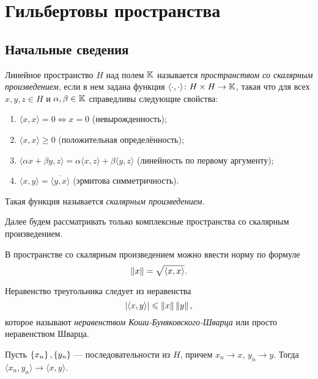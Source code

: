 \section{Гильбертовы пространства}
\subsection{Начальные сведения}
\begin{definition}
    Линейное пространство $H$ над полем $\mathbb{K}$ называется 
    \emph{пространством со скалярным произведением},
    если в нем задана функция $\langle \cdot, \cdot \rangle \colon H \times H
    \to \mathbb{K}$, такая что для всех $x, y, z \in H$ и $\alpha, \beta \in \mathbb{K}$
    справедливы следующие свойства:
    \begin{enumerate}
        \item $ \langle x, x \rangle = 0 \Leftrightarrow x = 0 $
            (невырожденность);
        \item $ \langle x, x \rangle \geq 0 $ (положительная определённость);
        \item $ \langle \alpha x + \beta y, z \rangle = \alpha \langle x, z
                \rangle + \beta \langle y, z \rangle $ (линейность по первому
                аргументу);
        \item $ \langle x, y \rangle = \overline{\langle y, x \rangle} $ (эрмитова
            симметричность).
    \end{enumerate}
    Такая функция называется \emph{скалярным произведением}.
\end{definition}

Далее будем рассматривать только комплексные пространства со скалярным
произведением.

В пространстве со скалярным произведением можно ввести норму по формуле
\begin{equation}\label{eq:hilbert_norm}
    \left\|x\right\| = \sqrt{\langle x, x \rangle}. 
\end{equation}

Неравенство треугольника следует из неравенства
\begin{equation}\label{eq:schwarz}
    \left|\langle x, y \rangle\right| \leqslant \left\|x\right\| \left\|y\right\|,
\end{equation}
которое называют \emph{неравенством Коши-Буняковского-Шварца} или просто
неравенством Шварца.

\begin{theorem}\label{th:cont}
    Пусть $\left\{x_n\right\}, \left\{y_n\right\}$ --- последовательности из $H$,
    причем $x_n \to x$, $y_n \to y$. Тогда $\langle x_n, y_n \rangle \to \langle
    x, y \rangle$.
\end{theorem}

